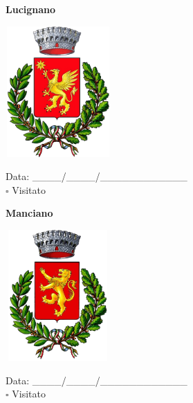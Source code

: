 \documentclass[a5paper,12pt]{article}
\begin{document}
\newpage

\noindent
\begin{minipage}[t]{0.45\textwidth}
    \begin{center}
        \textbf{Lucignano}
    \end{center}
    \vspace{-0.5cm} %
    \begin{center}
        \includegraphics[height= 5cm, width=4cm]{Toscana/Stemma Lucignano.png}
    \end{center}
    \vspace{-0.4cm} %
    \begin{flushleft}
        Data: \_\_\_\_/\_\_\_\_/\_\_\_\_\_\_\_\_\_\_\_\_ \\
        $\square$ Visitato
    \end{flushleft}
\end{minipage}
\hfill
\noindent
\begin{minipage}[t]{0.45\textwidth}
    \begin{center}
        \textbf{Manciano}
    \end{center}
    \vspace{-0.5cm} %
    \begin{center}
        \includegraphics[height= 5cm, width=4cm]{Toscana/Stemma Manciano.png}
    \end{center}
    \vspace{-0.4cm} %
    \begin{flushleft}
        Data: \_\_\_\_/\_\_\_\_/\_\_\_\_\_\_\_\_\_\_\_\_ \\
        $\square$ Visitato
    \end{flushleft}
\end{minipage}
\end{document}
